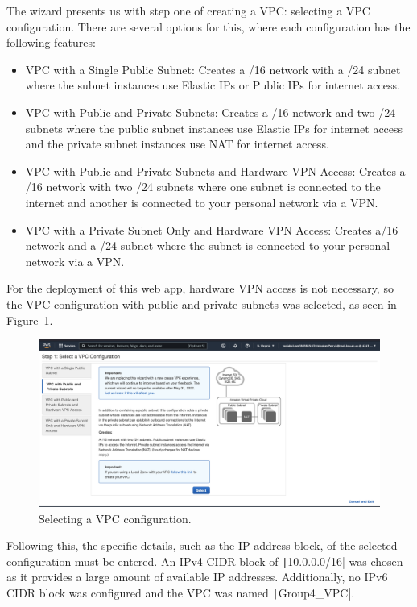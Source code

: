 The wizard presents us with step one of creating a VPC: selecting a VPC configuration.
There are several options for this, where each configuration has the following features:

\begin{itemize}
    \item VPC with a Single Public Subnet: Creates a /16 network with a /24 subnet where the subnet instances use
    Elastic IPs or Public IPs for internet access.
    \item VPC with Public and Private Subnets: Creates a /16 network and two /24 subnets where the public subnet
    instances use Elastic IPs for internet access and the private subnet instances use NAT for internet access.
    \item VPC with Public and Private Subnets and Hardware VPN Access: Creates a /16 network with two /24 subnets where
    one subnet is connected to the internet and another is connected to your personal network via a VPN\@.
    \item VPC with a Private Subnet Only and Hardware VPN Access: Creates a/16 network and a /24 subnet where the
    subnet is connected to your personal network via a VPN\@.
\end{itemize}

\clearpage
For the deployment of this web app, hardware VPN access is not necessary, so the VPC configuration with public and
private subnets was selected, as seen in Figure~\ref{fig:vpc-step-1}.

\begin{figure}[!htbp]
    \centering
    \includegraphics[width=115mm]{resources/vpc/step_1_select_a_vpc_configuration}
    \caption{Selecting a VPC configuration.}
    \label{fig:vpc-step-1}
\end{figure}

Following this, the specific details, such as the IP address block, of the selected configuration must be entered.
An IPv4 CIDR block of \texttt|10.0.0.0/16| was chosen as it provides a large amount of available IP addresses.
Additionally, no IPv6 CIDR block was configured and the VPC was named \texttt|Group4_VPC|.

